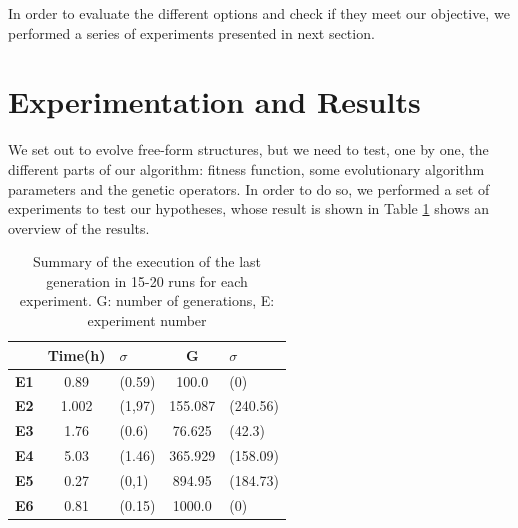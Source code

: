 \documentclass[sigconf]{acmart}
\newcommand{\myfloatalign}{\centering} %
\begin{document}
In order to evaluate the different options and check if they meet our
objective, we performed a series of experiments presented in next
section. 

\section{Experimentation and Results}\label{ch:res}

We set out to evolve free-form structures, but we need to test, one by
one, the different parts of our algorithm: fitness function, some
evolutionary algorithm parameters and the genetic operators. In order
to do so, we performed a set of experiments to test our hypotheses,
whose result is shown in Table \ref{t:resOver1} shows an overview of the results. 
\begin{table}
	\myfloatalign
	\begin{tabular}{cclcl}
		& \textbf{Time(h)} &$\sigma$ & \textbf{G}& $\sigma$ \\ \hline
		\textbf{E1}&0.89&(0.59)&100.0&(0)\\  \hline
		\textbf{E2}&1.002&(1,97)&155.087&(240.56) \\  \hline
		\textbf{E3}&1.76&(0.6)&76.625&(42.3)\\  \hline
		\textbf{E4}&5.03&(1.46)&365.929&(158.09)  \\  \hline
		\textbf{E5}&0.27&(0,1)&894.95&(184.73)     \\  \hline 
		\textbf{E6}&0.81&(0.15)&1000.0&(0) \\  \hline
		\hline
	\end{tabular}
	\caption{Summary of the execution of the last generation in 15-20 runs for each
		experiment.
		G: number of generations, E: experiment 
		number} %
	\label{t:resOver1}
\end{table}
\end{document}
